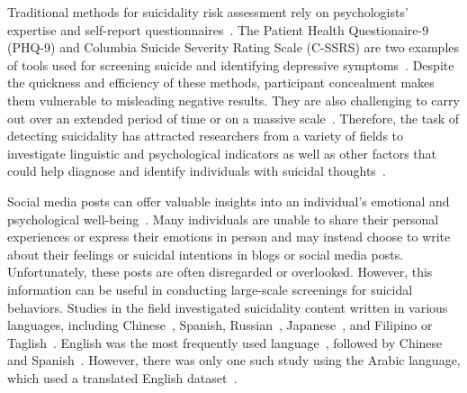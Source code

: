 \documentclass[sn-mathphys,Numbered]{sn-jnl}%
\begin{document}
Traditional methods for suicidality risk assessment rely on psychologists' expertise and self-report questionnaires~\cite{4liu2020suicidal}. The Patient Health Questionaire-9 (PHQ-9) and Columbia Suicide Severity Rating Scale (C-SSRS) are two examples of tools used for screening suicide and identifying depressive symptoms~\cite{5weber2017psychiatric}. Despite the quickness and efficiency of these methods, participant concealment makes them vulnerable to misleading negative results. They are also challenging to carry out over an extended period of time or on a massive scale~\cite{5weber2017psychiatric}.
Therefore, the task of detecting suicidality has attracted researchers from a variety of fields to investigate linguistic and psychological indicators as well as other factors that could help diagnose and identify individuals with suicidal thoughts~\cite{4liu2020suicidal}. 



Social media posts can offer valuable insights into an individual's emotional and psychological well-being~\cite{15n10.1145/2858036.2858207}. Many individuals are unable to share their personal experiences or express their emotions in person and may instead choose to write about their feelings or suicidal intentions in blogs or social media posts. Unfortunately, these posts are often disregarded or overlooked. However, this information can be useful in conducting large-scale screenings for suicidal behaviors. Studies in the field investigated suicidality content written in various languages, including Chinese~\cite{17huang2014detecting}, Spanish, Russian~\cite{22rajesh2020suicidal}, Japanese~\cite{24ramirez2020detection}, and Filipino or Taglish~\cite{1astoveza2018suicidal}. English was the most frequently used language~\cite{word2ODEA2015183,32n10.1145/2700171.2791023,14vioules2018detection,15moulahi2017dare,16ma2020dual,17huang2014detecting}, followed by Chinese~\cite{19narynov2019comparative,20du2018extracting,25na13010007,word1FAHEY2020112960} and Spanish~\cite{9ji2018supervised,26chiroma2018suiciderelated}. However, there was only one such study using the Arabic language, which used a translated English dataset~\cite{9966481}.
\end{document}
